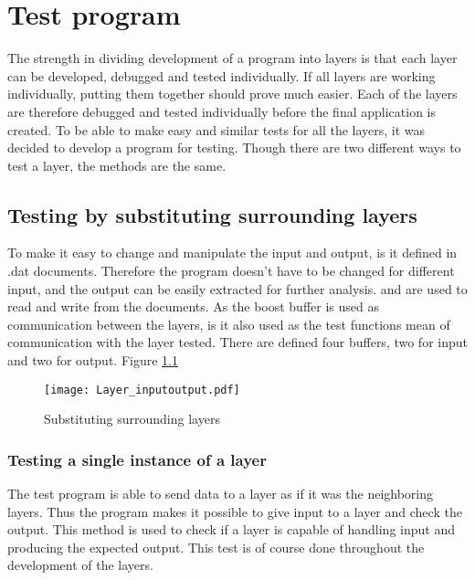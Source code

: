 
\chapter{Test program}\label{chap:test}


The strength in dividing development of a program into layers is that each layer can be developed, debugged and tested individually. If all layers are working individually, putting them together should prove much easier. Each of the layers are therefore debugged and tested individually before the final application is created. To be able to make easy and similar tests for all the layers, it was decided to develop a program for testing. Though there are two different ways to test a layer, the methods are the same.

\section{Testing by substituting surrounding layers}
To make it easy to change and manipulate the input and output, is it defined in .dat documents. Therefore the program doesn't have to be changed for different input, and the output can be easily extracted for further analysis.  and  are used to read and write from the documents. 
As the boost buffer is used as communication between the layers, is it also used as the test functions mean of communication with the layer tested. There are defined four buffers, two for input and two for output.
Figure \ref{fig:Layer_inputoutput}

\begin{figure}[htb]
	\begin{center}
	\texttt{[image: Layer\_inputoutput.pdf]}
	\caption{Substituting surrounding layers}
	\label{fig:Layer_inputoutput}	
	\end{center}
\end{figure}

\subsection{Testing a single instance of a layer}  

 The test program is able to send data to a layer as if it was the neighboring layers. Thus the program makes it possible to give input to a layer and check the output. This method is used to check if a layer is capable of  handling input and producing the expected output. This test is of course done throughout the development of the layers.


